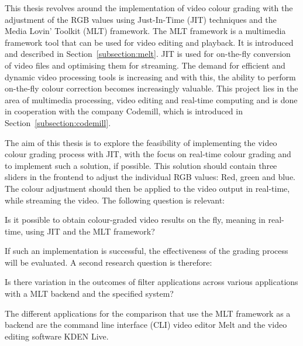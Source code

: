 \documentclass[../MasterThesis.tex]{subfiles}
\begin{document}
	
	This thesis revolves around the implementation of video colour grading with the adjustment of the RGB values using Just-In-Time (JIT) techniques and the Media Lovin' Toolkit (MLT) framework. The MLT framework is a multimedia framework tool that can be used for video editing and playback. It is introduced and described in Section~\ref{subsection:melt}.
	JIT is used for on-the-fly conversion of video files and optimising them for streaming. 
	The demand for efficient and dynamic video processing tools is increasing and with this, the ability to perform on-the-fly colour correction becomes increasingly valuable. 
	This project lies in the area of multimedia processing, video editing and real-time computing and is done in cooperation with the company Codemill, which is introduced in Section~\ref{subsection:codemill}.
	
	
	The aim of this thesis is to explore the feasibility of implementing the video colour grading process with JIT, with the focus on real-time colour grading and to implement such a solution, if possible. This solution should contain three sliders in the frontend to adjust the individual RGB values: Red, green and blue. The colour adjustment should then be applied to the video output in real-time, while streaming the video.
	The following question is relevant:
	
	\begin{researchbox}
		Is it possible to obtain colour-graded video results on the fly, meaning in real-time, using JIT and the MLT framework?
	\end{researchbox}
	
	If such an implementation is successful, the effectiveness of the grading process will be evaluated. A second research question is therefore: 
	
	\begin{researchbox}
		Is there variation in the outcomes of filter applications across various applications with a MLT backend and the specified system?
	\end{researchbox}


	The different applications for the comparison that use the MLT framework as a backend are the command line interface (CLI) video editor Melt and the video editing software KDEN Live. 
	
\end{document}
